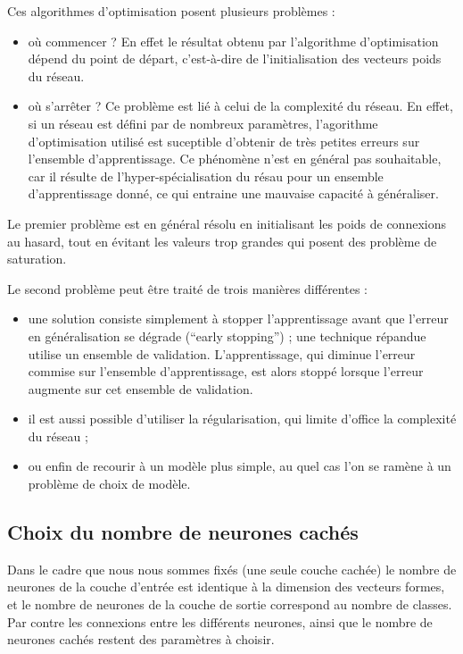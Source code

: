Ces algorithmes d'optimisation posent plusieurs probl\`emes :
\begin{itemize}
\item o\`u commencer ? En effet le r\'esultat obtenu par l'algorithme
d'optimisation d\'epend du point de d\'epart, c'est-\`a-dire de
l'initialisation des vecteurs poids du r\'eseau.
\item o\`u s'arr\^eter ? Ce probl\`eme est li\'e \`a celui de la complexit\'e
du r\'eseau. En effet, si un r\'eseau  est d\'efini par de nombreux
param\`etres, l'agorithme d'optimisation utilis\'e est suceptible 
d'obtenir de tr\`es petites erreurs sur l'ensemble d'apprentissage. Ce ph\'enom\`ene
n'est en g\'en\'eral pas souhaitable, car  il r\'esulte de 
l'hyper-sp\'ecialisation du r\'esau pour un ensemble d'apprentissage donn\'e, ce qui
entraine une mauvaise capacit\'e \`a g\'en\'eraliser.  
\end{itemize} 

Le premier probl\`eme est en g\'en\'eral r\'esolu en initialisant les poids de connexions
au hasard, tout en \'evitant  les valeurs trop grandes qui posent
des probl\`eme de saturation.
 
Le second probl\`eme peut \^etre trait\'e de trois mani\`eres diff\'erentes :
\begin{itemize}
\item une solution consiste simplement \`a  stopper l'apprentissage
avant que l'erreur en g\'en\'eralisation se d\'egrade (``early stopping'') ;
une technique r\'epandue utilise un ensemble de validation. L'apprentissage,
qui diminue l'erreur commise sur l'ensemble d'apprentissage, est alors stopp\'e
lorsque l'erreur augmente sur cet ensemble de validation.
\item il est aussi possible d'utiliser la r\'egularisation, qui limite
d'office la complexit\'e du r\'eseau ;
\item ou enfin de recourir \`a un mod\`ele plus simple, au quel cas l'on se ram\`ene
\`a un probl\`eme de choix de mod\`ele.
\end{itemize}

\subsection{Choix du nombre de neurones cach\'es}

Dans le cadre que nous nous sommes fix\'es (une seule couche cach\'ee) le nombre 
de neurones de la couche d'entr\'ee est identique \`a la dimension des vecteurs formes,
et le nombre de neurones de la couche de sortie correspond au nombre de classes.
Par contre les connexions entre les diff\'erents neurones, ainsi
que le nombre de neurones cach\'es restent des param\`etres \`a choisir.

